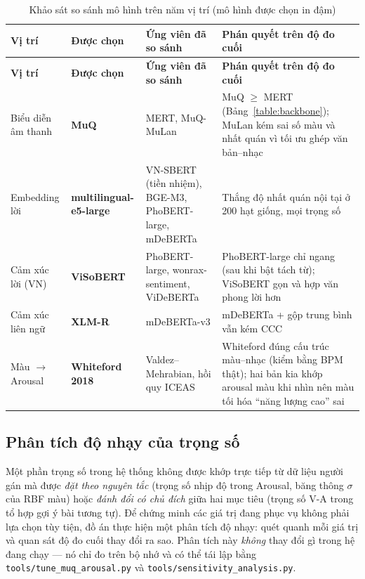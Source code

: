 \documentclass[../DoAn.tex]{subfiles}
\begin{document}
\begin{longtable}{|p{2.2cm}|p{2.5cm}|p{3.3cm}|p{4.5cm}|}
\caption{Khảo sát so sánh mô hình trên năm vị trí (mô hình được chọn in đậm)}\label{table:bakeoff}\\
\hline
\textbf{Vị trí} & \textbf{Được chọn} & \textbf{Ứng viên đã so sánh} & \textbf{Phán quyết trên độ đo cuối} \\
\hline
\endfirsthead
\hline
\textbf{Vị trí} & \textbf{Được chọn} & \textbf{Ứng viên đã so sánh} & \textbf{Phán quyết trên độ đo cuối} \\
\hline
\endhead
Biểu diễn âm thanh & \textbf{MuQ} & MERT, MuQ-MuLan & MuQ $\geq$ MERT (Bảng~\ref{table:backbone}); MuLan kém sai số màu và nhất quán vì tối ưu ghép văn bản--nhạc \\
\hline
Embedding lời & \textbf{multilingual\hspace{0pt}-e5-large} & VN-SBERT (tiền nhiệm), BGE-M3, PhoBERT-large, mDeBERTa & Thắng độ nhất quán nội tại ở 200 hạt giống, mọi trọng số \\
\hline
Cảm xúc lời (VN) & \textbf{ViSoBERT} & PhoBERT-large, wonrax-sentiment, ViDeBERTa & PhoBERT-large chỉ ngang (sau khi bật tách từ); ViSoBERT gọn và hợp văn phong lời hơn \\
\hline
Cảm xúc liên ngữ & \textbf{XLM-R} & mDeBERTa-v3 & mDeBERTa + gộp trung bình vẫn kém CCC \\
\hline
Màu $\rightarrow$ Arousal & \textbf{Whiteford 2018} & Valdez--Mehrabian, hồi quy ICEAS & Whiteford đúng cấu trúc màu--nhạc (kiểm bằng BPM thật); hai bản kia khớp arousal màu khi nhìn nên màu tối hóa ``năng lượng cao'' sai \\
\hline
\end{longtable}

\subsection{Phân tích độ nhạy của trọng số}
\label{subsection:eval-sensitivity}
Một phần trọng số trong hệ thống không được khớp trực tiếp từ dữ liệu người gán mà được \textit{đặt theo nguyên tắc} (trọng số nhịp độ trong Arousal, băng thông $\sigma$ của RBF màu) hoặc \textit{đánh đổi có chủ đích} giữa hai mục tiêu (trọng số V-A trong tổ hợp gợi ý bài tương tự). Để chứng minh các giá trị đang phục vụ không phải lựa chọn tùy tiện, đồ án thực hiện một phân tích độ nhạy: quét quanh mỗi giá trị và quan sát độ đo cuối thay đổi ra sao. Phân tích này \textit{không} thay đổi gì trong hệ đang chạy --- nó chỉ đo trên bộ nhớ và có thể tái lập bằng \texttt{tools/tune\_muq\_arousal.py} và \texttt{tools/sensitivity\_analysis.py}.
\end{document}

